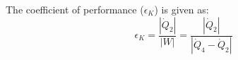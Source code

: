 The coefficient of performance (\( \epsilon_K \)) is given as:  
\[
\epsilon_K = \frac{| \dot{Q}_2 |}{| W |} = \frac{| \dot{Q}_2 |}{| \dot{Q}_4 - \dot{Q}_2 |}
\]
